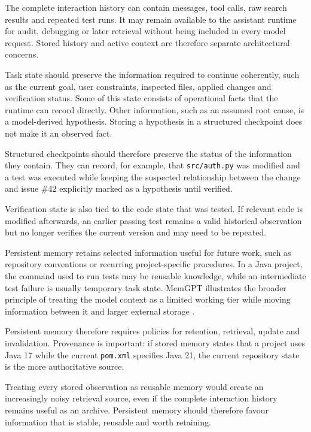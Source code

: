 The complete interaction history can contain messages, tool calls, raw search results and repeated test runs. It may remain available to the assistant runtime for audit, debugging or later retrieval without being included in every model request. Stored history and active context are therefore separate architectural concerns.

Task state should preserve the information required to continue coherently, such as the current goal, user constraints, inspected files, applied changes and verification status. Some of this state consists of operational facts that the runtime can record directly. Other information, such as an assumed root cause, is a model-derived hypothesis. Storing a hypothesis in a structured checkpoint does not make it an observed fact.

Structured checkpoints should therefore preserve the status of the information they contain. They can record, for example, that \texttt{src/auth.py} was modified and a test was executed while keeping the suspected relationship between the change and issue \#42 explicitly marked as a hypothesis until verified.

Verification state is also tied to the code state that was tested. If relevant code is modified afterwards, an earlier passing test remains a valid historical observation but no longer verifies the current version and may need to be repeated.

Persistent memory retains selected information useful for future work, such as repository conventions or recurring project-specific procedures. In a Java project, the command used to run tests may be reusable knowledge, while an intermediate test failure is usually temporary task state. MemGPT illustrates the broader principle of treating the model context as a limited working tier while moving information between it and larger external storage \parencite{packer2023memgpt}.

Persistent memory therefore requires policies for retention, retrieval, update and invalidation. Provenance is important: if stored memory states that a project uses Java 17 while the current \texttt{pom.xml} specifies Java 21, the current repository state is the more authoritative source.

Treating every stored observation as reusable memory would create an increasingly noisy retrieval source, even if the complete interaction history remains useful as an archive. Persistent memory should therefore favour information that is stable, reusable and worth retaining.

